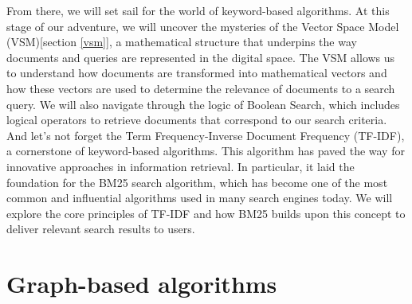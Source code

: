 \documentclass[10pt,english,a4paper]{article}
\begin{document}
From there, we will set sail for the world of keyword-based algorithms. At this stage of our adventure, we will uncover the mysteries of the Vector Space Model (VSM)[section \ref{vsm}], a mathematical structure that underpins the way documents and queries are represented in the digital space. The VSM allows us to understand how documents are transformed into mathematical vectors and how these vectors are used to determine the relevance of documents to a search query. We will also navigate through the logic of Boolean Search, which includes logical operators to retrieve documents that correspond to our search criteria. And let's not forget the Term Frequency-Inverse Document Frequency (TF-IDF), a cornerstone of keyword-based algorithms. This algorithm has paved the way for innovative approaches in information retrieval. In particular, it laid the foundation for the BM25 search algorithm, which has become one of the most common and influential algorithms used in many search engines today. We will explore the core principles of TF-IDF and how BM25 builds upon this concept to deliver relevant search results to users.
\section{Graph-based algorithms}\label{graph-based}
\end{document}
